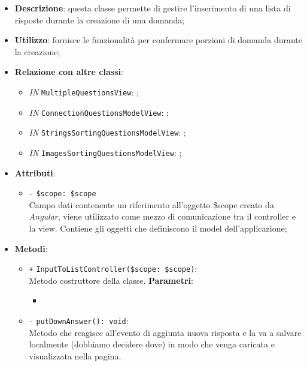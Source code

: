 \begin{itemize}
	\item \textbf{Descrizione}: questa classe permette di gestire l'inserimento di una lista di risposte durante la creazione di una domanda;
	\item \textbf{Utilizzo}: fornisce le funzionalità per confermare porzioni di domanda durante la creazione;
	\item \textbf{Relazione con altre classi}:
	\begin{itemize}
		\item \textit{IN} \texttt{MultipleQuestionsView}: ;
		\item \textit{IN} \texttt{ConnectionQuestionsModelView}: ;
		\item \textit{IN} \texttt{StringsSortingQuestionsModelView}: ; 
		\item \textit{IN} \texttt{ImagesSortingQuestionsModelView}: ;
	\end{itemize}
	\item \textbf{Attributi}:
	\begin{itemize}
		\item \texttt{-} \texttt{\$scope: \$scope} \\
		Campo dati contenente un riferimento all’oggetto \$scope creato da \textit{Angular}, viene utilizzato come mezzo di comunicazione tra il controller e la view. Contiene gli oggetti che definiscono il model dell’applicazione;
	\end{itemize}
	\item \textbf{Metodi}:
	\begin{itemize}
		\item \texttt{+} \texttt{InputToListController(\$scope: \$scope)}: \\Metodo costruttore della classe.
		\textbf{Parametri}:
		\begin{itemize}
			\item 
		\end{itemize}
		\item \texttt{-} \texttt{putDownAnswer(): void}: \\Metodo che reagisce all'evento di aggiunta nuova risposta e la va a salvare localmente (dobbiamo decidere dove) in modo che venga caricata e visualizzata nella pagina.
	\end{itemize}
\end{itemize}

